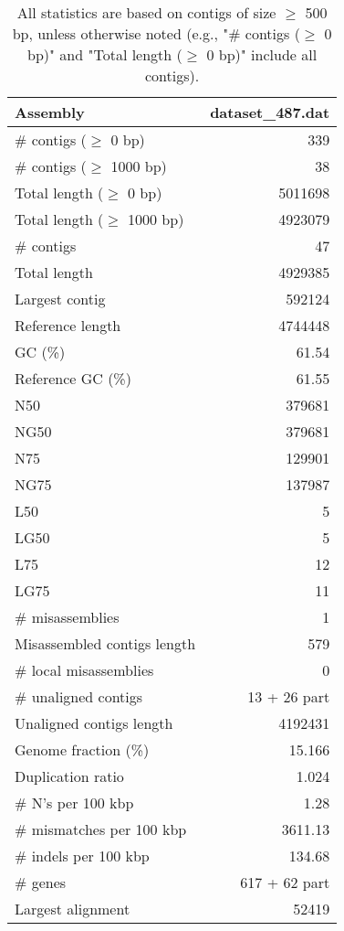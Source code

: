 \documentclass[12pt,a4paper]{article}
\begin{document}
\begin{table}[ht]
\begin{center}
\caption{All statistics are based on contigs of size $\geq$ 500 bp, unless otherwise noted (e.g., "\# contigs ($\geq$ 0 bp)" and "Total length ($\geq$ 0 bp)" include all contigs).}
\begin{tabular}{|l*{1}{|r}|}
\hline
Assembly & dataset\_487.dat \\ \hline
\# contigs ($\geq$ 0 bp) & 339 \\ \hline
\# contigs ($\geq$ 1000 bp) & 38 \\ \hline
Total length ($\geq$ 0 bp) & 5011698 \\ \hline
Total length ($\geq$ 1000 bp) & 4923079 \\ \hline
\# contigs & 47 \\ \hline
Total length & 4929385 \\ \hline
Largest contig & 592124 \\ \hline
Reference length & 4744448 \\ \hline
GC (\%) & 61.54 \\ \hline
Reference GC (\%) & 61.55 \\ \hline
N50 & 379681 \\ \hline
NG50 & 379681 \\ \hline
N75 & 129901 \\ \hline
NG75 & 137987 \\ \hline
L50 & 5 \\ \hline
LG50 & 5 \\ \hline
L75 & 12 \\ \hline
LG75 & 11 \\ \hline
\# misassemblies & 1 \\ \hline
Misassembled contigs length & 579 \\ \hline
\# local misassemblies & 0 \\ \hline
\# unaligned contigs & 13 + 26 part \\ \hline
Unaligned contigs length & 4192431 \\ \hline
Genome fraction (\%) & 15.166 \\ \hline
Duplication ratio & 1.024 \\ \hline
\# N's per 100 kbp & 1.28 \\ \hline
\# mismatches per 100 kbp & 3611.13 \\ \hline
\# indels per 100 kbp & 134.68 \\ \hline
\# genes & 617 + 62 part \\ \hline
Largest alignment & 52419 \\ \hline
\end{tabular}
\end{center}
\end{table}
\end{document}

